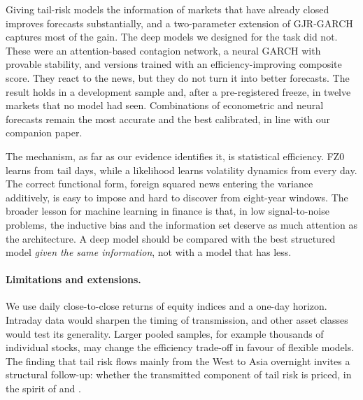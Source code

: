 Giving tail-risk models the information of markets that have already closed improves forecasts substantially, and a two-parameter extension of GJR-GARCH captures most of the gain. The deep models we designed for the task did not. These were an attention-based contagion network, a neural GARCH with provable stability, and versions trained with an efficiency-improving composite score. They react to the news, but they do not turn it into better forecasts. The result holds in a development sample and, after a pre-registered freeze, in twelve markets that no model had seen. Combinations of econometric and neural forecasts remain the most accurate and the best calibrated, in line with our companion paper.

The mechanism, as far as our evidence identifies it, is statistical efficiency. FZ0 learns from tail days, while a likelihood learns volatility dynamics from every day. The correct functional form, foreign squared news entering the variance additively, is easy to impose and hard to discover from eight-year windows. The broader lesson for machine learning in finance is that, in low signal-to-noise problems, the inductive bias and the information set deserve as much attention as the architecture. A deep model should be compared with the best structured model \emph{given the same information}, not with a model that has less.

\paragraph{Limitations and extensions.} We use daily close-to-close returns of equity indices and a one-day horizon. Intraday data would sharpen the timing of transmission, and other asset classes would test its generality. Larger pooled samples, for example thousands of individual stocks, may change the efficiency trade-off in favour of flexible models. The finding that tail risk flows mainly from the West to Asia overnight invites a structural follow-up: whether the transmitted component of tail risk is priced, in the spirit of \citet{kelly2014tail} and \citet{bali2009intertemporal}.
